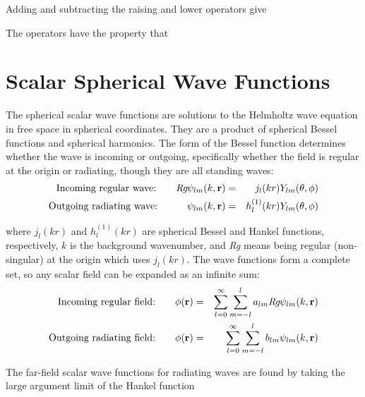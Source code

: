 Adding and subtracting the raising and lower operators give 

The operators have the property that 


\section{Scalar Spherical Wave Functions}

The spherical scalar wave functions are solutions to the Helmholtz wave equation in free space in spherical coordinates. They are a product of spherical Bessel functions and spherical harmonics.  The form of the Bessel function determines whether the wave is incoming or outgoing, specifically whether the field is regular at the origin or radiating, though they are all standing waves:  
\begin{eqnarray}
\textrm{Incoming regular wave:} \quad \quad\textit{Rg} \psi_{lm}(k,\mathbf{r}) &=& j_l(kr) Y_{lm}(\theta,\phi) \\
\textrm{Outgoing radiating wave:} \quad  \quad \quad \psi_{lm}(k,\mathbf{r}) &=& h_l^{(1)}(kr) Y_{lm}(\theta,\phi) 
\end{eqnarray}

\noindent where $j_l(kr)$ and $h_l^{(1)}(kr)$ are spherical Bessel and Hankel functions, respectively, $k$ is the background wavenumber, and \textit{Rg} means being regular (non-singular) at the origin which uses $j_l(kr)$. The wave functions form a complete set, so any scalar field can be expanded as an infinite sum: 
\begin{eqnarray}
\textrm{Incoming regular field:} \quad \quad \phi(\mathbf{r}) &=& \sum_{l=0}^{\infty} \sum_{m=-l}^l a_{lm} \textit{Rg} \psi_{lm}(k,\mathbf{r})  \\
\textrm{Outgoing radiating field:} \quad \quad \phi(\mathbf{r}) &=& \sum_{l=0}^{\infty} \sum_{m=-l}^l b_{lm} \psi_{lm}(k,\mathbf{r}) 
\end{eqnarray}

The far-field scalar wave functions for radiating waves are found by taking the large argument limit of the Hankel function


